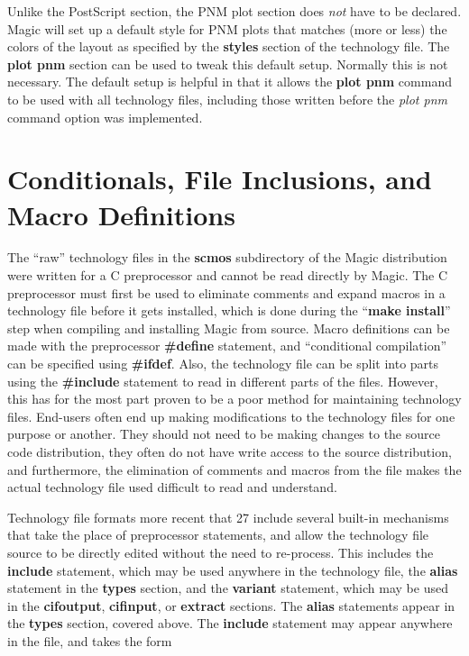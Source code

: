 \documentclass[letterpaper,twoside,12pt]{article}
\begin{document}
Unlike the PostScript section, the PNM plot section does {\itshape not}
have to be declared.  Magic will set up a default style for PNM plots
that matches (more or less) the colors of the layout as specified by
the {\bfseries styles} section of the technology file.  The {\bfseries
plot pnm} section can be used to tweak this default setup.  Normally
this is not necessary.  The default setup is helpful in that it allows
the {\bfseries plot pnm} command to be used with all technology files,
including those written before the {\itshape plot pnm} command option
was implemented.

\section{Conditionals, File Inclusions, and Macro Definitions}

The ``raw'' technology files in the {\bfseries scmos} subdirectory of
the Magic distribution were written for a C preprocessor and cannot be
read directly by Magic.  The C preprocessor must first be used
to eliminate comments and expand macros in a technology file before it gets
installed, which is done during the ``{\bfseries make install}'' step when
compiling and installing Magic from source.  
Macro definitions can be made with the preprocessor {\bfseries \#define}
statement, and ``conditional compilation'' can be specified using
{\bfseries \#ifdef}.  Also, the technology file can be split into parts
using the {\bfseries \#include} statement to read in different parts
of the files.
However, this has for the most part proven to be a poor method for
maintaining technology files.  End-users often end up making modifications
to the technology files for one purpose or another.  They should not
need to be making changes to the source code distribution, they often
do not have write access to the source distribution, and furthermore,
the elimination of comments and macros from the file makes the actual
technology file used difficult to read and understand.

Technology file formats more recent that 27 include several built-in
mechanisms that take the place of preprocessor statements, and allow
the technology file source to be directly edited without the need to
re-process.  This includes the {\bfseries include} statement, which may
be used anywhere in the technology file, the {\bfseries alias} statement
in the {\bfseries types} section, and the {\bfseries variant} statement,
which may be used in the {\bfseries cifoutput}, {\bfseries cifinput},
or {\bfseries extract} sections.  The {\bfseries alias} statements
appear in the {\bfseries types} section, covered above.  The {\bfseries
include} statement may appear anywhere in the file, and takes the form
\end{document}
